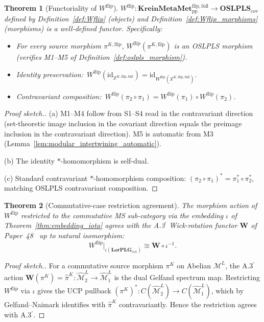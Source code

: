 \documentclass[11pt,a4paper]{article}
\theoremstyle{plain}
\newtheorem{theorem}{Theorem}[section]
\theoremstyle{definition}
\newcommand{\Mcal}{\mathcal{M}}
\newcommand{\Wfun}{\mathbf{W}}
\newcommand{\LorPLG}{\mathbf{LorPLG}_{\mathrm{cov}}}
\newcommand{\OSLPLS}{\mathbf{OSLPLS}_{\mathrm{cov}}}
\newcommand{\KreinMMflip}{\mathbf{KreinMetaMet}_{\mathrm{pp}}^{\mathrm{flip},\mathrm{full}}}
\newcommand{\Wflip}{W^{\mathrm{flip}}}
\newcommand{\osXkrein}{\mathbb{X}^{K,\mathrm{flip},\mathrm{full}}}
\begin{document}
\begin{theorem}[Functoriality of $\Wflip$]\label{thm:functoriality}
$\Wflip:\KreinMMflip\to\OSLPLS$ defined by
Definition~\ref{def:Wflip} (objects) and
Definition~\ref{def:Wflip_morphisms} (morphisms) is a well-defined
functor. Specifically:
\begin{itemize}
\item[(a)] For every source morphism $\pi^{K,\mathrm{flip}}$,
$\Wflip(\pi^{K,\mathrm{flip}})$ is an OSLPLS morphism
(verifies M1--M5 of Definition~\ref{def:oslpls_morphism}).
\item[(b)] Identity preservation:\
$\Wflip(\mathrm{id}_{\osXkrein})=\mathrm{id}_{\Wflip(\osXkrein)}$.
\item[(c)] Contravariant composition:\
$\Wflip(\pi_{2}\circ\pi_{1})=\Wflip(\pi_{1})\circ\Wflip(\pi_{2})$.
\end{itemize}
\end{theorem}

\begin{proof}[Proof sketch.]
(a) M1--M4 follow from S1--S4 read in the contravariant direction
(set-theoretic image inclusion in the covariant direction equals the
preimage inclusion in the contravariant direction). M5 is automatic
from M3 (Lemma~\ref{lem:modular_intertwining_automatic}).

(b) The identity $*$-homomorphism is self-dual.

(c) Standard contravariant $*$-homomorphism composition:
$(\pi_{2}\circ\pi_{1})^{*}=\pi_{1}^{*}\circ\pi_{2}^{*}$, matching
OSLPLS contravariant composition.
\end{proof}

\begin{theorem}[Commutative-case restriction agreement]
\label{thm:commutative_restriction}
The morphism action of $\Wflip$ restricted to the commutative MS
sub-category via the embedding $\iota$ of
Theorem~\ref{thm:embedding_iota} agrees with the A.3$^{\prime}$
Wick-rotation functor $\Wfun$ of Paper~48~\cite{paper48} up to
natural isomorphism:
\[
  \Wflip|_{\iota(\LorPLG)} \cong \Wfun\circ\iota^{-1}.
\]
\end{theorem}

\begin{proof}[Proof sketch.]
For a commutative source morphism $\pi^{K}$ on Abelian
$\Mcal^{L}$, the A.3$^{\prime}$ action $\Wfun(\pi^{K})=\hat{\pi}^{K}:
\hat{\Mcal}^{L}_{2}\to\hat{\Mcal}^{L}_{1}$ is the dual Gelfand
spectrum map. Restricting $\Wflip$ via $\iota$ gives the UCP
pullback $(\pi^{K})^{*}:C(\hat{\Mcal}^{L}_{2})\to C(\hat{\Mcal}^{L}_{1})$,
which by Gelfand--Naimark identifies with $\hat{\pi}^{K}$
contravariantly. Hence the restriction agrees with A.3$^{\prime}$.
\end{proof}
\end{document}
